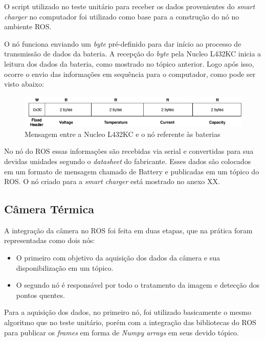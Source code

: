      O script utilizado no teste unitário para receber os dados provenientes do \textit{smart charger} no computador foi utilizado como base para a construção do nó no ambiente ROS.
     
     O nó funciona enviando um \textit{byte} pré-definido para dar início ao processo de transmissão de dados da bateria. A recepção do \textit{byte} pela Nucleo L432KC inicia a leitura dos dados da bateria, como mostrado no tópico anterior. Logo após isso, ocorre o envio das informações em sequência para o computador, como pode ser visto abaixo:
      
      \begin{figure}[!ht]
		   \centering
		   \includegraphics[width=16cm]{Figures/batt_protocol_2.png}
		   \caption{Mensagem entre a Nucleo L432KC e o nó referente às baterias}
		   \label{fig:battprotocol2}
		\end{figure}
		      
      No nó do ROS essas informações são recebidas via serial e convertidas para sua devidas unidades segundo o \textit{datasheet} do fabricante. Esses dados são colocados em um formato de mensagem chamado de Battery e publicadas em um tópico do ROS. O nó criado para a \textit{smart charger} está mostrado no anexo XX.
     
     \subsection{Câmera Térmica}
     
     A integração da câmera no ROS foi feita em duas etapas, que na prática foram representadas como dois nós:
     
     \begin{itemize}
         \item O primeiro com objetivo da aquisição dos dados da câmera e sua disponibilização em um tópico.
         \item O segundo nó é responsável por todo o tratamento da imagem e detecção dos pontos quentes.
     \end{itemize}
     
     Para a aquisição dos dados, no primeiro nó, foi utilizado basicamente o mesmo algoritmo que no teste unitário, porém com a integração das bibliotecas do ROS para publicar os \textit{frames} em forma de \textit{Numpy arrays} em seus devido tópico.
     
